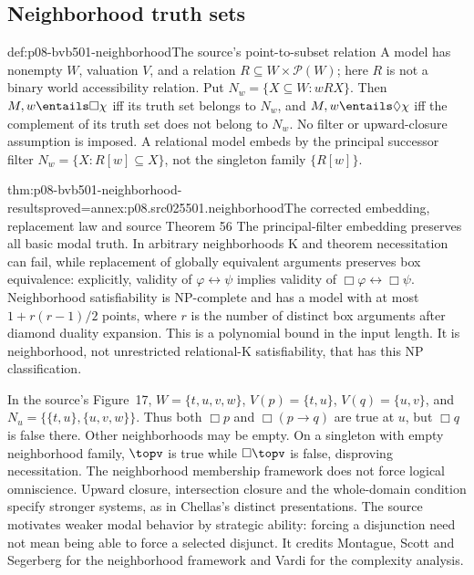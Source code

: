 \subsection{Neighborhood truth sets}
\label{sec:p08-bvb501-neighborhood}

\begin{hbdefinition}{def:p08-bvb501-neighborhood}{The source's point-to-subset relation}
A model has nonempty \(W\), valuation \(V\), and a relation
\(R\subseteq W\times\mathcal P(W)\); here \(R\) is not
a binary world accessibility relation. Put
\(N_w=\{X\subseteq W:wRX\}\). Then
\(M,w\entails\Box\chi\) iff its truth set belongs to \(N_w\),
and \(M,w\entails\Diamond\chi\) iff the complement of its
truth set does not belong to \(N_w\). No filter or upward-closure
assumption is imposed. A relational model embeds by the principal
successor filter \(N_w=\{X:R[w]\subseteq X\}\), not the singleton
family \(\{R[w]\}\).
\end{hbdefinition}

\begin{hbtheorem}{thm:p08-bvb501-neighborhood-results}{proved=annex:p08.src025501.neighborhood}{The corrected embedding, replacement law and source Theorem 56}
The principal-filter embedding preserves all basic modal truth. In
arbitrary neighborhoods K and theorem necessitation can fail, while
replacement of globally equivalent arguments preserves box equivalence:
explicitly, validity of \(\varphi\leftrightarrow\psi\) implies
validity of \(\Box\varphi\leftrightarrow\Box\psi\).
Neighborhood satisfiability is NP-complete and has a model with at most
\(1+r(r-1)/2\) points, where \(r\) is the number of distinct
box arguments after diamond duality expansion. This is a polynomial
bound in the input length. It is neighborhood, not unrestricted
relational-K satisfiability, that has this NP classification.
\end{hbtheorem}

In the source's Figure~17, \(W=\{t,u,v,w\}\),
\(V(p)=\{t,u\}\), \(V(q)=\{u,v\}\), and
\(N_u=\{\{t,u\},\{u,v,w\}\}\). Thus both \(\Box p\)
and \(\Box(p\to q)\) are true at \(u\), but \(\Box q\)
is false there. Other neighborhoods may be empty. On a singleton with
empty neighborhood family, \(\topv\) is true while \(\Box\topv\)
is false, disproving necessitation. The neighborhood membership framework
does not force logical omniscience. Upward closure, intersection closure
and the whole-domain condition specify stronger systems, as in Chellas's
distinct presentations. The source motivates weaker modal behavior by
strategic ability: forcing a disjunction need not mean being able to
force a selected disjunct. It credits Montague, Scott and Segerberg for
the neighborhood framework and Vardi for the complexity analysis.

